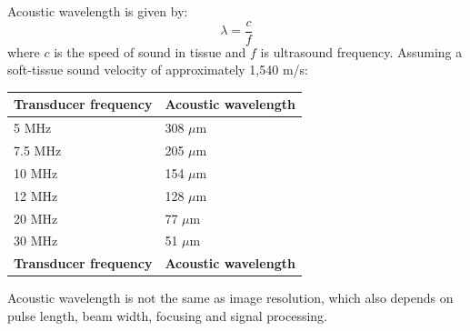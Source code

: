 Acoustic wavelength is given by:
\[
\lambda=\frac{c}{f}
\]
where $c$ is the speed of sound in tissue and $f$ is ultrasound frequency. Assuming a soft-tissue sound velocity of approximately 1,540 m/s:

\begin{longtable}{@{}p{}p{}@{}}
\toprule
\textbf{Transducer frequency} & \textbf{Acoustic wavelength} \\
\midrule
\endfirsthead
\toprule
5 MHz & 308 $\mu$m \\
\midrule
\endhead
7.5 MHz & 205 $\mu$m \\
10 MHz & 154 $\mu$m \\
12 MHz & 128 $\mu$m \\
20 MHz & 77 $\mu$m \\
30 MHz & 51 $\mu$m \\
\textbf{Transducer frequency} & \textbf{Acoustic wavelength} \\
\bottomrule
\end{longtable}
Acoustic wavelength is not the same as image resolution, which also depends on pulse length, beam width, focusing and signal processing.

